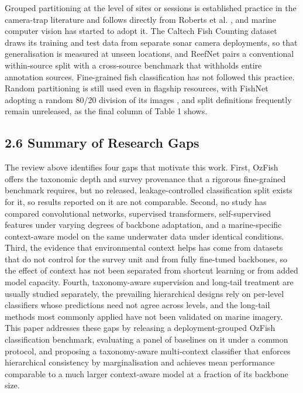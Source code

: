 \documentclass[preprint,12pt]{elsarticle}
\begin{document}
Grouped partitioning at the level of sites or sessions is established
practice in the camera-trap literature
\cite{ref18} and follows directly from Roberts
et al. \cite{ref17}, and marine computer vision
has started to adopt it. The Caltech Fish Counting dataset
\cite{ref21} draws its training and test data
from separate sonar camera deployments, so that generalisation is
measured at unseen locations, and ReefNet
\cite{ref13} pairs a conventional within-source
split with a cross-source benchmark that withholds entire annotation
sources. Fine-grained fish classification has not followed this
practice. Random partitioning is still used even in flagship resources,
with FishNet adopting a random 80/20 division of its images
\cite{ref10}, and split definitions frequently
remain unreleased, as the final column of Table 1 shows.

\subsection*{2.6 Summary of Research
Gaps}\label{summary-of-research-gaps}

The review above identifies four gaps that motivate this work. First,
OzFish offers the taxonomic depth and survey provenance that a rigorous
fine-grained benchmark requires, but no released, leakage-controlled
classification split exists for it, so results reported on it are not
comparable. Second, no study has compared convolutional networks,
supervised transformers, self-supervised features under varying degrees
of backbone adaptation, and a marine-specific context-aware model on the
same underwater data under identical conditions. Third, the evidence
that environmental context helps has come from datasets that do not
control for the survey unit and from fully fine-tuned backbones, so the
effect of context has not been separated from shortcut learning or from
added model capacity. Fourth, taxonomy-aware supervision and long-tail
treatment are usually studied separately, the prevailing hierarchical
designs rely on per-level classifiers whose predictions need not agree
across levels, and the long-tail methods most commonly applied have not
been validated on marine imagery. This paper addresses these gaps by
releasing a deployment-grouped OzFish classification benchmark,
evaluating a panel of baselines on it under a common protocol, and
proposing a taxonomy-aware multi-context classifier that enforces
hierarchical consistency by marginalisation and achieves mean
performance comparable to a much larger context-aware model at a
fraction of its backbone size.
\end{document}
